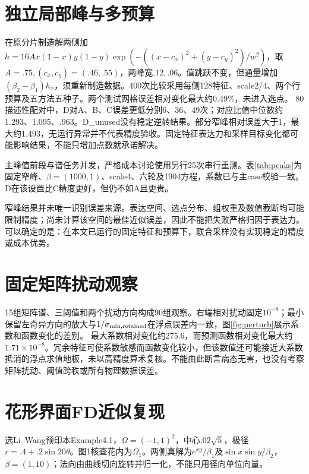 \section{独立局部峰与多预算}
在原分片制造解两侧加$h=16A x(1-x)y(1-y)\exp(-((x-c_x)^2+(y-c_y)^2)/w^2)$，取$A=.75,(c_x,c_y)=(.46,.55)$，两峰宽$.12,.06$。值跳跃不变，但通量增加$(\beta_2-\beta_1)h_x$，须重新制造数据。400次比较采用每侧128特征、scale2/4、两个行预算及五方法五种子。两个测试网格误差相对变化最大约0.49\%，未进入选点。
80描述性配对中，D对A、B、C误差更低分别6、36、49次；对应比值中位数约1.293、1.095、.963。D\_unused没有稳定逆转结果。部分窄峰相对误差大于1，最大约1.493，无运行异常并不代表精度验收。固定特征表达力和采样目标变化都可能影响结果，不能只增加点数就承诺解决。

主峰值前段与谱任务并发，严格成本讨论使用另行25次串行重测。表\ref{tab:peaks}为固定窄峰、$\beta=(1000,1)$、scale4、六轮及1904方程，系数已与主case校验一致。D在该设置比C精度更好，但仍不如A且更贵。
\begin{table}[htbp]\centering\caption{固定峰值场景的串行完整成本，误差均值及样本标准差}\label{tab:peaks}\resizebox{\textwidth}{!}{}\end{table}

窄峰结果并未唯一识别误差来源。表达空间、选点分布、组权重及数值截断均可能限制精度；尚未计算该空间的最佳近似误差，因此不能把失败严格归因于表达力。可以确定的是：在本文已运行的固定特征和预算下，联合采样没有实现稳定的精度或成本优势。

\section{固定矩阵扰动观察}
15组矩阵谱、三阈值和两个扰动方向构成90组观察。右端相对扰动固定$10^{-8}$；最小保留左奇异方向的放大与$1/\sigma_{\min,\rm retained}$在浮点误差内一致，图\ref{fig:perturb}展示系数和函数变化的差别。
最大系数相对变化约275.6，而预测函数相对变化最大约$1.71\times10^{-8}$。冗余特征可使系数敏感而函数变化较小，但该数值还可能接近大系数抵消的浮点求值地板，未以高精度算术复核。不能由此断言病态无害，也没有考察矩阵扰动、阈值跨秩或所有物理数据误差。

\section{花形界面FD近似复现}
选Li--Wang预印本Example4.1\cite{interfacepreprint}，$\Omega=(-1,1)^2$，中心$.02\sqrt5$，极径$r=.4+.2\sin20\theta$。图1核查花内为$\Omega_1$。两侧真解为$e^{xy}/\beta_1$及$\sin x\sin y/\beta_2$，$\beta=(1,10)$；法向由曲线切向旋转并归一化，不能只用径向单位向量。

